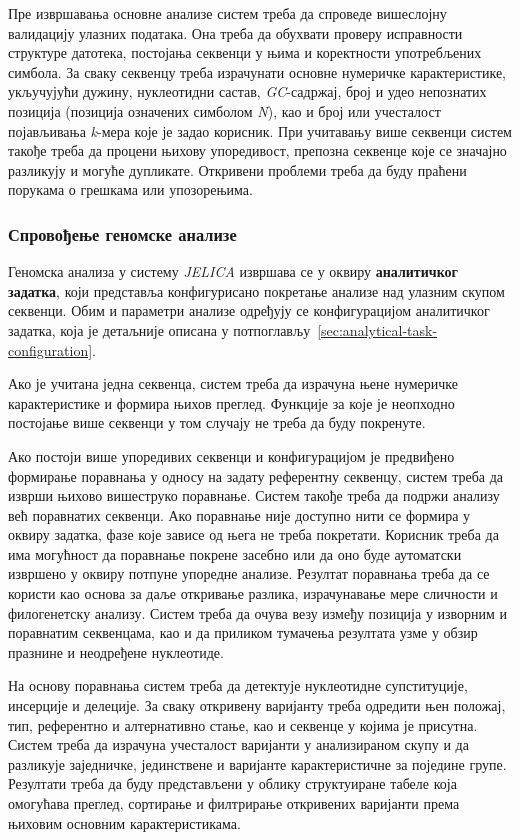 \documentclass[12pt,oneside]{memoir}
\begin{document}
Пре извршавања основне анализе систем треба да спроведе вишеслојну валидацију улазних података. Она треба да обухвати проверу исправности структуре датотека, постојања секвенци у њима и коректности употребљених симбола. За сваку секвенцу треба израчунати основне нумеричке карактеристике, укључујући дужину, нуклеотидни састав, \textit{GC}-садржај, број и удео непознатих позиција (позиција означених симболом \textit{N}), као и број или учесталост појављивања \textit{k}-мера које је задао корисник. При учитавању више секвенци систем такође треба да процени њихову упоредивост, препозна секвенце које се значајно разликују и могуће дупликате. Откривени проблеми треба да буду праћени порукама о грешкама или упозорењима.


\subsubsection{Спровођење геномске анализе}
\label{sec:conducting-genomic-analysis}
Геномска анализа у систему \textit{JELICA} извршава се у оквиру \textbf{аналитичког задатка}, који представља конфигурисано покретање анализе над улазним скупом секвенци. Обим и параметри анализе одређују се конфигурацијом аналитичког задатка, која је детаљније описана у потпоглављу~\ref{sec:analytical-task-configuration}.

Ако је учитана једна секвенца, систем треба да израчуна њене нумеричке карактеристике и формира њихов преглед. Функције за које је неопходно постојање више секвенци у том случају не треба да буду покренуте.

Ако постоји више упоредивих секвенци и конфигурацијом је предвиђено формирање поравнања у односу на задату референтну секвенцу, систем треба да изврши њихово вишеструко поравнање. Систем такође треба да подржи анализу већ поравнатих секвенци. Ако поравнање није доступно нити се формира у оквиру задатка, фазе које зависе од њега не треба покретати. Корисник треба да има могућност да поравнање покрене засебно или да оно буде аутоматски извршено у оквиру потпуне упоредне анализе. Резултат поравнања треба да се користи као основа за даље откривање разлика, израчунавање мере сличности и филогенетску анализу. Систем треба да очува везу између позиција у изворним и поравнатим секвенцама, као и да приликом тумачења резултата узме у обзир празнине и неодређене нуклеотиде.

На основу поравнања систем треба да детектује нуклеотидне супституције, инсерције и делеције. За сваку откривену варијанту треба одредити њен положај, тип, референтно и алтернативно стање, као и секвенце у којима је присутна. Систем треба да израчуна учесталост варијанти у анализираном скупу и да разликује заједничке, јединствене и варијанте карактеристичне за поједине групе. Резултати треба да буду представљени у облику структуиране табеле која омогућава преглед, сортирање и филтрирање откривених варијанти према њиховим основним карактеристикама.
\end{document}
